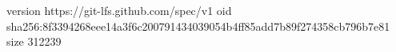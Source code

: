 version https://git-lfs.github.com/spec/v1
oid sha256:8f3394268eee14a3f6c200791434039054b4ff85add7b89f274358cb796b7e81
size 312239
